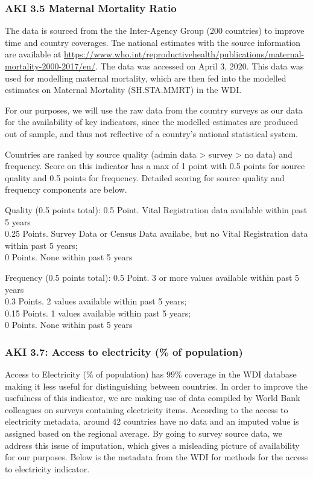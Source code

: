 \documentclass[]{article}
\begin{document}
\hypertarget{aki-3.5-maternal-mortality-ratio}{%
\subsubsection{AKI 3.5 Maternal Mortality
Ratio}\label{aki-3.5-maternal-mortality-ratio}}

The data is sourced from the the Inter-Agency Group (200 countries) to
improve time and country coverages. Tne national estimates with the
source information are available at
\url{https://www.who.int/reproductivehealth/publications/maternal-mortality-2000-2017/en/}.
The data was accessed on April 3, 2020. This data was used for modelling
maternal mortality, which are then fed into the modelled estimates on
Maternal Mortality (SH.STA.MMRT) in the WDI.

For our purposes, we will use the raw data from the country surveys as
our data for the availability of key indicators, since the modelled
estimates are produced out of sample, and thus not reflective of a
country's national statistical system.

Countries are ranked by source quality (admin data \textgreater{} survey
\textgreater{} no data) and frequency. Score on this indicator has a max
of 1 point with 0.5 points for source quality and 0.5 points for
frequency. Detailed scoring for source quality and frequency components
are below.

Quality (0.5 points total): 0.5 Point. Vital Registration data available
within past 5 years\\
0.25 Points. Survey Data or Census Data availabe, but no Vital
Registration data within past 5 years;\\
0 Points. None within past 5 years

Frequency (0.5 points total): 0.5 Point. 3 or more values available
within past 5 years\\
0.3 Points. 2 values available within past 5 years;\\
0.15 Points. 1 values available within past 5 years;\\
0 Points. None within past 5 years

\hypertarget{aki-3.7-access-to-electricity-of-population}{%
\subsubsection{AKI 3.7: Access to electricity (\% of
population)}\label{aki-3.7-access-to-electricity-of-population}}

Access to Electricity (\% of population) has 99\% coverage in the WDI
database making it less useful for distinguishing between countries. In
order to improve the usefulness of this indicator, we are making use of
data compiled by World Bank colleagues on surveys containing electricity
items. According to the access to electricity metadata, around 42
countries have no data and an imputed value is assigned based on the
regional average. By going to survey source data, we address this issue
of imputation, which gives a misleading picture of availability for our
purposes. Below is the metadata from the WDI for methods for the access
to electricity indicator.
\end{document}
